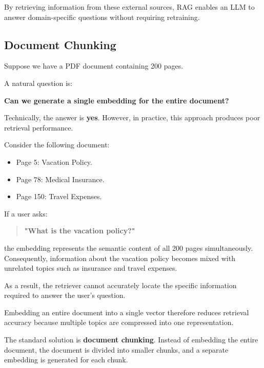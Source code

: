 By retrieving information from these external sources, RAG enables an LLM to answer domain-specific questions without requiring retraining.

\subsection*{Document Chunking}

Suppose we have a PDF document containing 200 pages.

A natural question is:

\begin{center}
\textbf{Can we generate a single embedding for the entire document?}
\end{center}

Technically, the answer is \textbf{yes}. However, in practice, this approach produces poor retrieval performance.

Consider the following document:

\begin{itemize}
    \item Page 5: Vacation Policy.
    \item Page 78: Medical Insurance.
    \item Page 150: Travel Expenses.
\end{itemize}

If a user asks:

\begin{quote}
\textbf{"What is the vacation policy?"}
\end{quote}

the embedding represents the semantic content of all 200 pages simultaneously. Consequently, information about the vacation policy becomes mixed with unrelated topics such as insurance and travel expenses.

As a result, the retriever cannot accurately locate the specific information required to answer the user's question.

Embedding an entire document into a single vector therefore reduces retrieval accuracy because multiple topics are compressed into one representation.

The standard solution is \textbf{document chunking}. Instead of embedding the entire document, the document is divided into smaller chunks, and a separate embedding is generated for each chunk.

